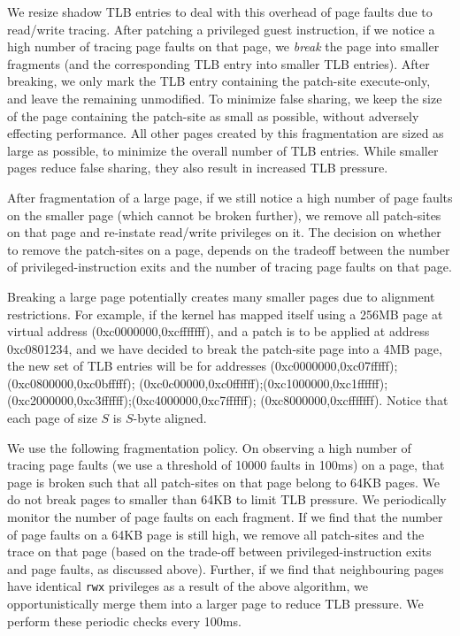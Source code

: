 \documentclass[10pt,twocolumn]{article}
\begin{document}
We resize shadow TLB entries to deal with this overhead of page faults due to read/write
tracing. After patching a privileged guest instruction, if we notice
a high number of tracing page faults on that page, we {\em break} the page into
smaller fragments (and the corresponding TLB entry into smaller TLB entries).
After breaking,
we only mark the
TLB entry containing the patch-site execute-only, and leave the remaining
unmodified.
To minimize false sharing, we keep the
size of the page containing the patch-site as small as possible, without
adversely effecting performance. All other pages created by this fragmentation
are sized
as large as possible, to minimize
the overall number of TLB entries. While smaller pages reduce false sharing, they
also result in increased TLB pressure.

After fragmentation of a large page, if we still notice a high number of page faults
on the smaller page (which cannot be broken further), we remove all patch-sites
on that page and re-instate read/write privileges on it. The decision on
whether to remove the patch-sites on a page, depends on the tradeoff
between the number of privileged-instruction exits and the number of
tracing page faults on that page.

Breaking a large page potentially creates
many smaller pages due to alignment restrictions.
For example, if the kernel has mapped
itself using a 256MB page at virtual address (0xc0000000,0xcfffffff), and a
patch is to be applied at address 0xc0801234, and we have decided to break
the patch-site page into a 4MB page, the new set of TLB entries will be for
addresses
(0xc0000000,0xc07fffff);(0xc0800000,0xc0bfffff);
(0xc0c00000,0xc0ffffff);(0xc1000000,0xc1ffffff);
(0xc2000000,0xc3ffffff);(0xc4000000,0xc7ffffff);
(0xc8000000,0xcfffffff). Notice that each page of size $S$ is $S$-byte
aligned.

We use the following fragmentation policy. On
observing a high number of tracing page faults (we use a threshold of 10000 faults in
100ms) on a page, that page is broken such that all patch-sites on that page
belong to 64KB pages. We do not break pages to smaller than 64KB to
limit TLB pressure. We periodically monitor the number of page faults on
each fragment. If we find that the number of page faults on a 64KB page is still high,
we remove all patch-sites and the trace on that page (based on the trade-off
between privileged-instruction exits and page faults, as discussed above).
Further, if we find that neighbouring pages have identical {\tt rwx} privileges
as a result of the above algorithm,
we opportunistically merge them into a larger page to reduce TLB pressure. We perform
these periodic checks every 100ms.
\end{document}
